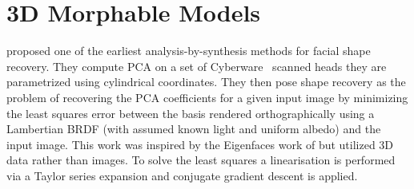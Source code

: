 \section{3D Morphable Models}\label{ch:bg_3dmm}
\cite{atick1996statistical} proposed one of the earliest analysis-by-synthesis
methods for facial shape recovery. They compute PCA on a set of 
Cyberware~\cite{cyberware} scanned heads they are parametrized using
cylindrical coordinates. They then pose shape recovery as the problem
of recovering the PCA coefficients for a given input image by minimizing
the least squares error between the basis rendered orthographically
using a Lambertian BRDF (with assumed known light and uniform albedo) 
and the input image. This work was inspired by the Eigenfaces work of 
\citet{Sirovich:1987te} but utilized 3D data rather than images. To solve
the least squares a linearisation is performed via a Taylor series expansion
and conjugate gradient descent is applied.

